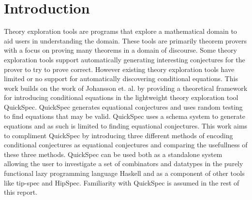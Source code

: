 \section{Introduction}
Theory exploration tools are programs that
explore a mathematical domain to aid users in
understanding the domain. %
These tools are primarily theorem provers with a focus
on proving many theorems in a domain of discourse.
Some theory exploration tools support automatically generating
interesting conjectures for the prover to try to prove correct.
However existing theory exploration tools have limited or no
support for automatically discovering conditional equations.
This work builds on the work of Johansson et. al. %
by providing a theoretical framework for introducing conditional
equations in the lightweight theory exploration tool QuickSpec. %
QuickSpec generates equational conjectures and uses random testing to
find equations that may be valid. QuickSpec uses a schema system to
generate equations and as such is limited to finding equational conjectures.
This work aims to compliment QuickSpec by introducing three different methods
of encoding conditional conjectures as equational conjectures and comparing
the usefullness of these three methods. QuickSpec can be used both as a standalone
system allowing the user to investigate a set of combinators and datatypes in the
purely functional lazy programming language Haskell and as a component of other tools %
like tip-spec and HipSpec. %
Familiarity with QuickSpec is assumed in the rest of this report.
